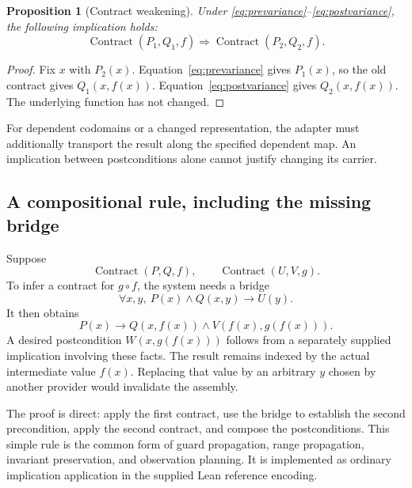 \documentclass[11pt,a4paper]{article}
\newcommand{\Contract}{\operatorname{Contract}}
\theoremstyle{plain}
\newtheorem{proposition}[theorem]{Proposition}
\theoremstyle{definition}
\begin{document}
\begin{proposition}[Contract weakening]
Under \eqref{eq:prevariance}--\eqref{eq:postvariance}, the following implication holds:
\[
 \Contract(P_1,Q_1,f)\Longrightarrow\Contract(P_2,Q_2,f).
\]
\end{proposition}
\begin{proof}
Fix $x$ with $P_2(x)$. Equation~\eqref{eq:prevariance} gives $P_1(x)$, so the old contract gives $Q_1(x,f(x))$. Equation~\eqref{eq:postvariance} gives $Q_2(x,f(x))$. The underlying function has not changed.
\end{proof}
For dependent codomains or a changed representation, the adapter must additionally transport the result along the specified dependent map. An implication between postconditions alone cannot justify changing its carrier.

\subsection{A compositional rule, including the missing bridge}
Suppose
\[
 \Contract(P,Q,f),\qquad \Contract(U,V,g).
\]
To infer a contract for $g\circ f$, the system needs a bridge
\[
 \forall x,y,\ P(x)\land Q(x,y)\to U(y).
\]
It then obtains
\[
 P(x)\to Q(x,f(x))\land V(f(x),g(f(x))).
\]
A desired postcondition $W(x,g(f(x)))$ follows from a separately supplied implication involving these facts. The result remains indexed by the actual intermediate value $f(x)$. Replacing that value by an arbitrary $y$ chosen by another provider would invalidate the assembly.

The proof is direct: apply the first contract, use the bridge to establish the second precondition, apply the second contract, and compose the postconditions. This simple rule is the common form of guard propagation, range propagation, invariant preservation, and observation planning. It is implemented as ordinary implication application in the supplied Lean reference encoding.
\end{document}
